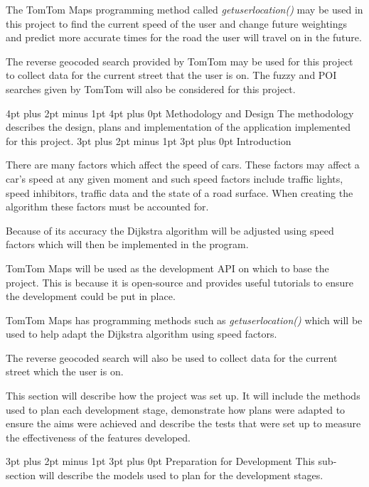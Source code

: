 \documentclass[12pt,a4paper]{article}
\makeatletter
\renewcommand\subsection{\@startsection {subsection}{1}{0mm} %
                               {3pt plus 2pt minus 1pt} %
                               {3pt plus 0pt} %
                               {\normalfont\bfseries}}
\renewcommand\section{\@startsection {section}{1}{0mm} %
                               {4pt plus 2pt minus 1pt} %
                               {4pt plus 0pt} %
                               {\Large\bfseries}}
\makeatother
\begin{document}
The TomTom Maps programming method called \textit{getuserlocation()} may be used in this project to find the current speed of the user and change future weightings and predict more accurate times for the road the user will travel on in the future. 

The reverse geocoded search provided by TomTom may be used for this project to collect data for the current street that the user is on. 
The fuzzy and POI searches given by TomTom will also be considered for this project.


\newpage
\section{Methodology and Design}
The methodology describes the design, plans and implementation of the application implemented for this project.
\subsection{Introduction}

There are many factors which affect the speed of cars. These factors may affect a car's speed at any given moment and such speed factors include traffic lights, speed inhibitors, traffic data and the state of a road surface. When creating the algorithm these factors must be accounted for.

Because of its accuracy the Dijkstra algorithm will be adjusted using speed factors which will then be implemented in the program.

 TomTom Maps will be used as the development API on which to base the project. This is because it is open-source and provides useful tutorials to ensure the development could be put in place.

TomTom Maps has programming methods such as \textit{getuserlocation()} which will be used to help adapt the Dijkstra algorithm using speed factors.

The reverse geocoded search will also be used to collect data for the current street which the user is on. 

This section will describe how the project was set up. It will include the methods used to plan each development stage, demonstrate how plans were adapted to ensure the aims were achieved and describe the tests that were set up to measure the effectiveness of the features developed.

\subsection{Preparation for Development}
This sub-section will describe the models used to plan for the development stages.
\end{document}

